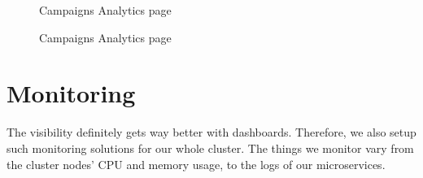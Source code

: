 \begin{figure}[H]
    \centering
    \caption{Campaigns Analytics page}
    \label{fig:campaigns-analytics-page-1}
\end{figure}
\begin{figure}[H]
    \centering
    \caption{Campaigns Analytics page}
    \label{fig:campaign-analytics-page-2}
\end{figure}
\newpage

\section{Monitoring}
The visibility definitely gets way better with dashboards.
Therefore, we also setup such monitoring solutions for our whole cluster.
The things we monitor vary from the cluster nodes' CPU and memory usage, to the logs of our microservices.

